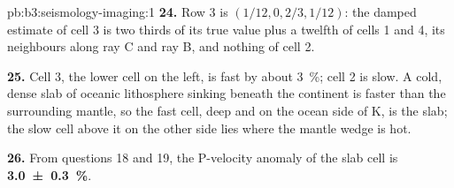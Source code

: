 \begin{solution}{pb:b3:seismology-imaging:1}
\textbf{24.} Row 3 is $(1/12, 0, 2/3, 1/12)$: the damped estimate of cell 3 is
two thirds of its true value plus a twelfth of cells 1 and 4, its neighbours
along ray C and ray B, and nothing of cell 2.

\textbf{25.} Cell 3, the lower cell on the left, is fast by about
\qty{3}{\percent}; cell 2 is slow. A cold, dense slab of oceanic lithosphere
sinking beneath the continent is faster than the surrounding mantle, so the
fast cell, deep and on the ocean side of K, is the slab; the slow cell above
it on the other side lies where the mantle wedge is hot.

\textbf{26.} From questions 18 and 19, the P-velocity anomaly of the slab cell is
\textbf{\qty[text-series-to-math=true, uncertainty-mode=separate]{3.0 \pm 0.3}{\percent}}.
\end{solution}
